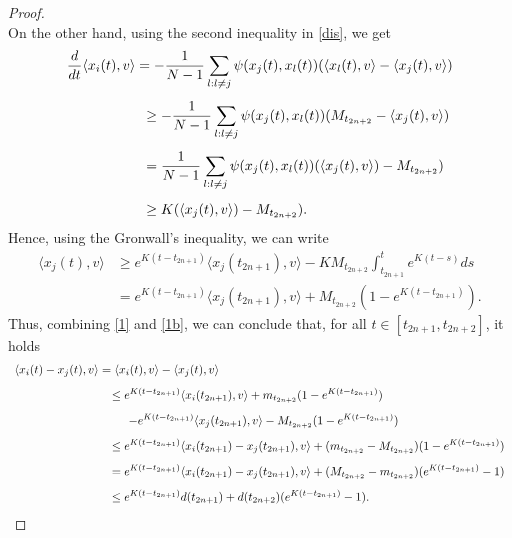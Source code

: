 \documentclass[a4paper,11pt,oneside]{article}
\begin{document}
\begin{proof}
\begin{equation}
	\end{equation}
On the other hand, using the second inequality in \eqref{dis}, we get 
$$\begin{array}{l}
	\vspace{0.3cm}\displaystyle{\frac{d}{dt}\langle x_{i}(t),v\rangle=-\frac{1}{N-1}\sum_{l:l\neq j}\psi(x_{j}(t),x_{l}(t))(\langle x_{l}(t),v\rangle-\langle x_{j}(t),v\rangle)}\\
	\vspace{0.3cm}\displaystyle{\hspace{2cm}\geq -\frac{1}{N-1}\sum_{l:l\neq j}\psi(x_{j}(t),x_{l}(t))(M_{t_{2n+2}}-\langle x_{j}(t),v\rangle)}\\
	\vspace{0.3cm}\displaystyle{\hspace{2cm}=\frac{1}{N-1}\sum_{l:l\neq j}\psi(x_{j}(t),x_{l}(t))(\langle x_{j}(t),v\rangle)-M_{t_{2n+2}})}\\
	\displaystyle{\hspace{2cm}\geq K(\langle x_{j}(t),v\rangle)-M_{t_{2n+2}}).}
\end{array}$$
Hence, using the Gronwall's inequality, we can write
\begin{equation}\label{1b}
	\begin{split}
		\langle x_{j}(t),v\rangle&\geq e^{K(t-t_{2n+1})}\langle x_{j}(t_{2n+1}),v\rangle-KM_{t_{2n+2}}\int_{t_{2n+1}}^{t}e^{K(t-s)}ds\\&=e^{K(t-t_{2n+1})}\langle x_{j}(t_{2n+1}),v\rangle+M_{t_{2n+2}}(1-e^{K(t-t_{2n+1})}).
	\end{split}
\end{equation}
Thus, combining \eqref{1} and \eqref{1b}, we can conclude that, for all $t\in [t_{2n+1},t_{2n+2}]$, it holds 
$$\begin{array}{l}
    \vspace{0.3cm}\displaystyle{\langle x_{i}(t)-x_{j}(t),v\rangle=\langle x_{i}(t),v\rangle-\langle x_{j}(t),v\rangle}\\
	\vspace{0.3cm}\displaystyle{\hspace{2.9cm}\leq e^{K(t-t_{2n+1})}\langle x_{i}(t_{2n+1}),v\rangle+m_{t_{2n+2}}(1-e^{K(t-t_{2n+1})})}\\
	\vspace{0.3cm}\displaystyle{\hspace{3.4cm}-e^{K(t-t_{2n+1})}\langle x_{j}(t_{2n+1}),v\rangle-M_{t_{2n+2}}(1-e^{K(t-t_{2n+1})})}\\	\vspace{0.3cm}\displaystyle{\hspace{2.9cm}\leq e^{K(t-t_{2n+1})}\langle x_{i}(t_{2n+1})-x_{j}(t_{2n+1}),v\rangle+(m_{t_{2n+2}}-M_{t_{2n+2}})(1-e^{K(t-t_{2n+1})})}\\	\vspace{0.3cm}\displaystyle{\hspace{2.9cm}=e^{K(t-t_{2n+1})}\langle x_{i}(t_{2n+1})-x_{j}(t_{2n+1}),v\rangle+(M_{t_{2n+2}}-m_{t_{2n+2}})(e^{K(t-t_{2n+1})}-1)}\\	\displaystyle{\hspace{2.9cm}\leq e^{K(t-t_{2n+1})}d(t_{2n+1})+d(t_{2n+2})(e^{K(t-t_{2n+1})}-1).}

\end{array}$$
\end{proof}
\end{document}
